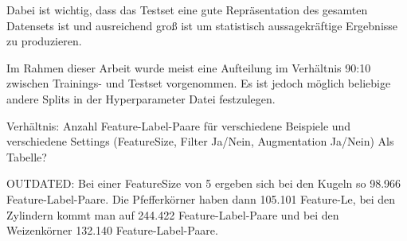 Dabei ist wichtig, dass das Testset eine gute Repräsentation des gesamten Datensets ist 
und ausreichend groß ist um statistisch aussagekräftige Ergebnisse zu produzieren.

Im Rahmen dieser Arbeit wurde meist eine Aufteilung im Verhältnis 90:10 zwischen Trainings- und Testset vorgenommen.
Es ist jedoch möglich beliebige andere Splits in der Hyperparameter Datei festzulegen.



















\color{blue}
Verhältnis: Anzahl Feature-Label-Paare für verschiedene Beispiele und verschiedene Settings
(FeatureSize, Filter Ja/Nein, Augmentation Ja/Nein) Als Tabelle?

OUTDATED:
Bei einer FeatureSize von 5 ergeben sich bei den Kugeln so 98.966 Feature-Label-Paare.
Die Pfefferkörner haben dann 105.101 Feature-Le,
bei den Zylindern kommt man auf 244.422 Feature-Label-Paare
und bei den Weizenkörner 132.140 Feature-Label-Paare.
\color{black}
